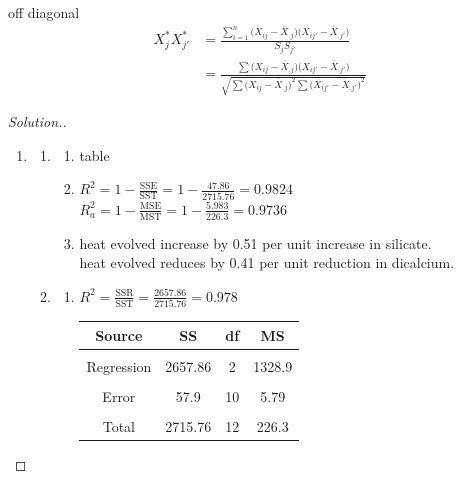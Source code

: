 \documentclass[11pt,a4paper]{article}
\theoremstyle{definition}
\newenvironment{solution}
  {\renewcommand{\qedsymbol}{}\begin{proof}[\textit{Solution}.]}
  {\end{proof}}
\begin{document}
off diagonal 
\begin{align*}
X^{*}_jX^*_{j'} & = \frac{\sum\limits^n_{i=1}\big(X_{ij}-\overline{X}_{.j}\big)\big(X_{ij'}-\overline{X}_{.j'}\big)}{S_jS_{j'}}\\
                & = \frac{\sum\big(X_{ij}-\overline{X}_{.j}\big)\big(X_{ij'}-\overline{X}_{.j'}\big)}{\sqrt{\sum \big(X_{ij}-\overline{X}_{.j}\big)^2\sum\big(X_{ij'}-\overline{X}_{.j'}\big)^2}}
\end{align*}


\begin{solution}
\begin{enumerate}
\item[]
\begin{enumerate}
\item[b).]
\begin{enumerate}
       \item table
       \item $R^2=1-\frac{\text{SSE}}{\text{SST}}=1-\frac{47.86}{2715.76}=0.9824$\\
       
       $R^2_a=1-\frac{\text{MSE}}{\text{MST}}=1-\frac{5.983}{226.3}=0.9736$\\
       
       \item heat evolved increase by 0.51 per unit increase in silicate.\\
       heat evolved reduces by 0.41 per unit reduction in dicalcium.\\
\end{enumerate}


\item[c).]
\begin{enumerate}
         \item $R^2=\frac{\text{SSR}}{\text{SST}}=\frac{2657.86}{2715.76}=0.978$\\
         
\begin{table}[H]
\centering
\begin{tabular}{|c|c|c|c|}
\hline
Source & SS & df & MS\\
\hline
&&&\\
Regression & 2657.86 & 2 & 1328.9\\
&&&\\
Error & 57.9 & 10 & 5.79\\
&&&\\
Total & 2715.76 & 12 & 226.3\\
\hline
\end{tabular}
\end{table}


\end{enumerate}
\end{enumerate}
\end{enumerate}
\end{solution}
\end{document}
